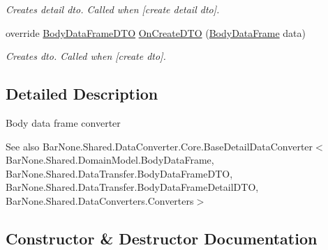 \begin{DoxyCompactItemize}
\begin{DoxyCompactList}\small\item\em Creates detail dto. Called when \mbox{[}create detail dto\mbox{]}. \end{DoxyCompactList}\item 
override \mbox{\hyperlink{class_bar_none_1_1_shared_1_1_data_transfer_1_1_body_data_frame_d_t_o}{Body\+Data\+Frame\+D\+TO}} \mbox{\hyperlink{class_bar_none_1_1_shared_1_1_data_converters_1_1_body_data_frame_converter_a4f6da5fd8b4f5ea3f285b9acae6dd40b}{On\+Create\+D\+TO}} (\mbox{\hyperlink{class_bar_none_1_1_shared_1_1_domain_model_1_1_body_data_frame}{Body\+Data\+Frame}} data)
\begin{DoxyCompactList}\small\item\em Creates dto. Called when \mbox{[}create dto\mbox{]}. \end{DoxyCompactList}\end{DoxyCompactItemize}


\subsection{Detailed Description}
Body data frame converter 

\begin{DoxySeeAlso}{See also}
Bar\+None.\+Shared.\+Data\+Converter.\+Core.\+Base\+Detail\+Data\+Converter$<$\+Bar\+None.\+Shared.\+Domain\+Model.\+Body\+Data\+Frame, Bar\+None.\+Shared.\+Data\+Transfer.\+Body\+Data\+Frame\+D\+T\+O, Bar\+None.\+Shared.\+Data\+Transfer.\+Body\+Data\+Frame\+Detail\+D\+T\+O, Bar\+None.\+Shared.\+Data\+Converters.\+Converters$>$


\end{DoxySeeAlso}


\subsection{Constructor \& Destructor Documentation}
\mbox{\label{class_bar_none_1_1_shared_1_1_data_converters_1_1_body_data_frame_converter_a224a376c438bea5aeefa8a9925f54085}} 
